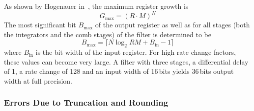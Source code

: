 As shown by Hogenauer in~\cite{1163535}, the maximum register growth is
\begin{equation}
    \label{eq:cic:maximum_register_growth}
    G_\mathrm{max} = (R \cdot M)^N
\end{equation}
The most  significant bit $B_\mathrm{max}$ of  the output register as  well as
for all  stages (both the  integrators and the comb  stages) of the  filter is
determined to be
\begin{equation}
    \label{eq:cic:maximum_register_growth:bit_width}
    B_\mathrm{max} = \lceil N \log_2 RM + B_\mathrm{in} - 1 \rceil
\end{equation}
where $B_\mathrm{in}$ is  the bit width of the input  register.  For high rate
change  factors, these  values can  become very  large.  A  filter with  three
stages, a  differential delay of  \num{1}, a rate  change of \num{128}  and an
input  width of  \num{16}\,bits  yields  \num{36}\,bits output  width at  full
precision.

\subsubsection{Errors Due to Truncation and Rounding}
\label{subsubsec:cic:truncation_and_rounding}

